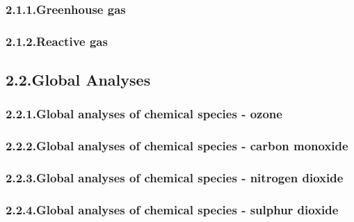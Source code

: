 \documentclass[9pt]{report}
\begin{document}
\subsubsection{2.1.1.\hspace*{0.5em}Greenhouse gas}\label{sec-greenhouse-gas}%

\subsubsection{2.1.2.\hspace*{0.5em}Reactive gas}\label{sec-reactive-gas}%

\subsection{2.2.\hspace*{0.5em}Global Analyses}\label{sec-global-analyses}%

\subsubsection{2.2.1.\hspace*{0.5em}Global analyses of chemical species - ozone}\label{sec-global-analyses-of-chemical-species---ozone}%

\subsubsection{2.2.2.\hspace*{0.5em}Global analyses of chemical species - carbon monoxide}\label{sec-global-analyses-of-chemical-species---carbon-monoxide}%

\subsubsection{2.2.3.\hspace*{0.5em}Global analyses of chemical species - nitrogen dioxide}\label{sec-global-analyses-of-chemical-species---nitrogen-dioxide}%

\subsubsection{2.2.4.\hspace*{0.5em}Global analyses of chemical species - sulphur dioxide}\label{sec-global-analyses-of-chemical-species---sulphur-dioxide}%
\end{document}
